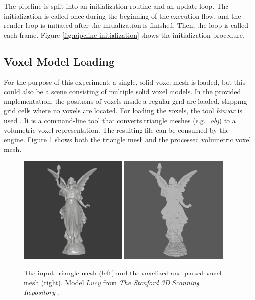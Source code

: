 \noindent
The pipeline is split into an initialization routine and an update loop. The initialization is called once during 
the beginning of the execution flow, and the render loop is initiated after the initialization is finished. Then, 
the loop is called each frame. Figure \ref{fig:pipeline-initialization} shows the initialization procedure. 

\subsection*{Voxel Model Loading} \label{subsec-voxel-model-loading}

For the purpose of this experiment, a single, solid voxel mesh is loaded, but this could also be a scene 
consisting of multiple solid voxel models. In the provided implementation, the positions of voxels inside a regular 
grid are loaded, skipping grid cells where no voxels are located. For loading the voxels, the tool \emph{binvox} 
is used \cite{binvox, Nooruddin2003}. It is a command-line tool that converts triangle meshes (e.g. \emph{.obj}) to 
a volumetric voxel representation. The resulting file can be consumed by the engine. Figure 
\ref{fig:trimesh-to-voxel-mesh} shows both the triangle mesh and the processed volumetric voxel mesh. 

\begin{figure}[h]
    \centering
    \includegraphics[width=200px]{images/graphics/lucy-triangle-mesh.jpg}
    \includegraphics[width=200px]{images/graphics/lucy-voxel-mesh.jpg}
    \caption{The input triangle mesh (left) and the voxelized and parsed voxel mesh (right). 
    Model \emph{Lucy} from \emph{The Stanford 3D Scanning Repository} \cite{Stanford23}.}
    \label{fig:trimesh-to-voxel-mesh}
\end{figure}


